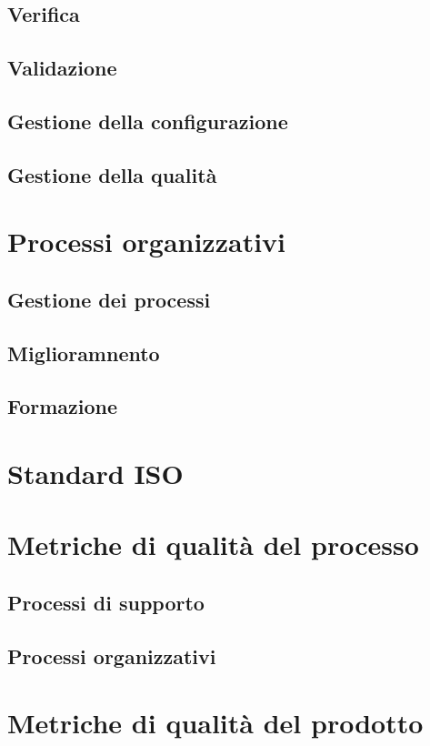 \documentclass[italian,12pt]{article} %
\begin{document}
\subsection{Verifica}
\subsection{Validazione}
\subsection{Gestione della configurazione}
\subsection{Gestione della qualità}

\section{Processi organizzativi}
\subsection{Gestione dei processi}
\subsection{Miglioramnento}
\subsection{Formazione}

\section{Standard ISO}

\section{Metriche di qualità del processo}
\subsection{Processi di supporto}
\subsection{Processi organizzativi}

\section{Metriche di qualità del prodotto}
\end{document}
